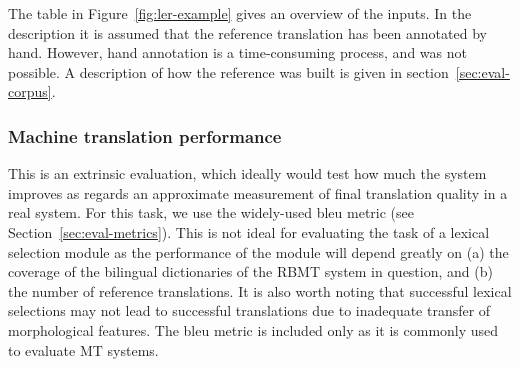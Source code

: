 \documentclass[11pt]{article}
\newcommand{\comment}[1]{\todo{#1}}
\begin{document}


The table in Figure~\ref{fig:ler-example} gives an
overview of the inputs.  In the description it is assumed that the
reference translation has been annotated by hand. However, hand
annotation is a time-consuming process, and was not possible. A
description of how the reference was built is given in
section~\ref{sec:eval-corpus}.

\subsubsection{Machine translation performance} 
This is
an extrinsic evaluation, which ideally would test how much the system
improves as regards an approximate measurement of final translation
quality in a real system. For this task, we use the widely-used {\sc
  bleu} metric (see Section~\ref{sec:eval-metrics}). This is not ideal
for evaluating the task of a lexical selection module as the
performance of the module will depend greatly on (a) the coverage of
the bilingual dictionaries of the RBMT system in question, and (b) the
number of reference translations. It is also worth noting that
successful lexical selections may not lead to successful translations
due to inadequate transfer of morphological features. 
The {\sc bleu} metric \citep{papineni02} is
included only as it is commonly used to evaluate MT systems. 

\end{document}
